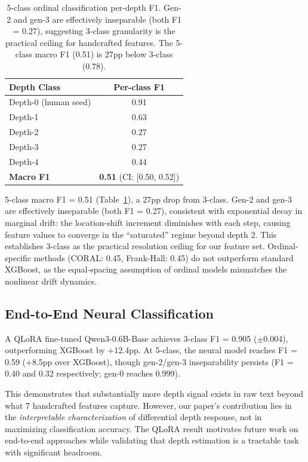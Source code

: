 \documentclass[11pt,a4paper]{article}
\begin{document}
\begin{table}[t]
\centering
\small
\begin{tabular}{lc}
\toprule
\textbf{Depth Class} & \textbf{Per-class F1} \\
\midrule
Depth-0 (human seed) & 0.91 \\
Depth-1              & 0.63 \\
Depth-2              & 0.27 \\
Depth-3              & 0.27 \\
Depth-4              & 0.44 \\
\midrule
\textbf{Macro F1}    & \textbf{0.51} (CI: [0.50, 0.52]) \\
\bottomrule
\end{tabular}
\caption{5-class ordinal classification per-depth F1. Gen-2 and gen-3 are effectively inseparable (both F1 = 0.27), suggesting 3-class granularity is the practical ceiling for handcrafted features. The 5-class macro F1 (0.51) is 27pp below 3-class (0.78).}
\label{tab:fiveclass}
\end{table}

5-class macro F1 = 0.51 (Table~\ref{tab:fiveclass}), a 27pp drop from 3-class. Gen-2 and gen-3 are effectively inseparable (both F1 = 0.27), consistent with exponential decay in marginal drift: the location-shift increment diminishes with each step, causing feature values to converge in the ``saturated'' regime beyond depth 2. This establishes 3-class as the practical resolution ceiling for our feature set. Ordinal-specific methods (CORAL: 0.45, Frank-Hall: 0.45) do not outperform standard XGBoost, as the equal-spacing assumption of ordinal models mismatches the nonlinear drift dynamics.

\subsection{End-to-End Neural Classification}

A QLoRA fine-tuned Qwen3-0.6B-Base achieves 3-class F1 = 0.905 ($\pm$0.004), outperforming XGBoost by +12.4pp. At 5-class, the neural model reaches F1 = 0.59 (+8.5pp over XGBoost), though gen-2/gen-3 inseparability persists (F1 = 0.40 and 0.32 respectively; gen-0 reaches 0.999).

This demonstrates that substantially more depth signal exists in raw text beyond what 7 handcrafted features capture. However, our paper's contribution lies in the \emph{interpretable characterization} of differential depth response, not in maximizing classification accuracy. The QLoRA result motivates future work on end-to-end approaches while validating that depth estimation is a tractable task with significant headroom.
\end{document}
